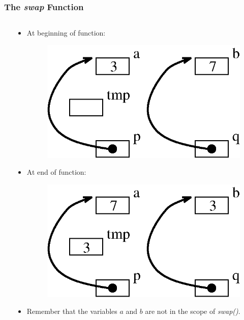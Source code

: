 \begin{frame}[fragile]
\frametitle{The {\em swap} Function}
\begin{columns}[T]

\begin{column}{0.45\textwidth}

\end{column}


\pause
\begin{column}{0.45\textwidth}
\begin{itemize}[<+->]
\item At beginning of function:
\begin{center}
\begin{figure}[h]
\centerline{
\includegraphics[scale=0.40]{../Figs/point8_7.eps}
}
\end{figure}
\end{center}

\item At end of function:
\begin{center}
\begin{figure}[h]
\centerline{
\includegraphics[scale=0.40]{../Figs/point8_8.eps}
}
\end{figure}
\end{center}
\item Remember that the variables $a$ and $b$ are not in the scope of
{\em swap()}.
\end{itemize}

\end{column}

\end{columns}
\end{frame}


